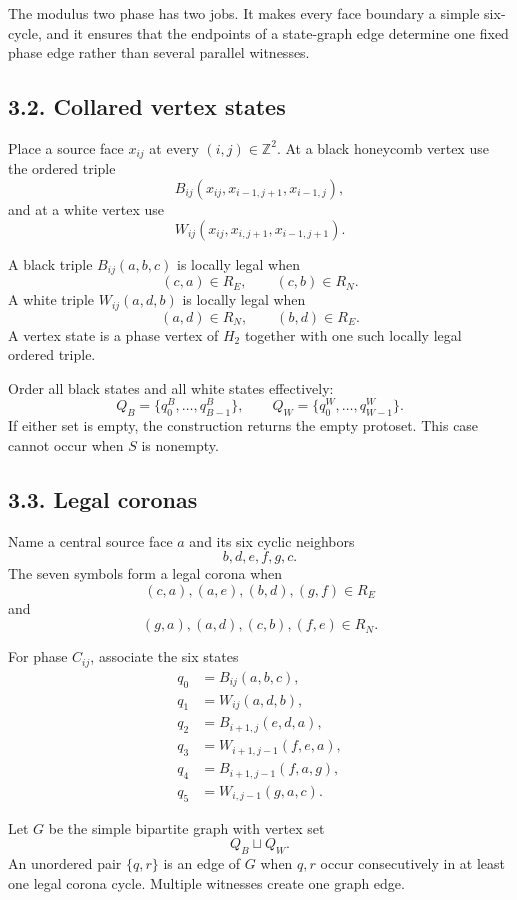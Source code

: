 \documentclass[11pt]{article}
\begin{document}
The modulus two phase has two jobs. It makes every face boundary a simple
six-cycle, and it ensures that the endpoints of a state-graph edge determine
one fixed phase edge rather than several parallel witnesses.

\subsection*{3.2. Collared vertex states}

Place a source face \(x_{ij}\) at every \((i,j)\in\mathbb Z^2\). At a black
honeycomb vertex use the ordered triple
\[
  B_{ij}(x_{ij},x_{i-1,j+1},x_{i-1,j}),
\]
and at a white vertex use
\[
  W_{ij}(x_{ij},x_{i,j+1},x_{i-1,j+1}).
\]

A black triple \(B_{ij}(a,b,c)\) is locally legal when
\[
  (c,a)\in R_E,\qquad (c,b)\in R_N.
\]
A white triple \(W_{ij}(a,d,b)\) is locally legal when
\[
  (a,d)\in R_N,\qquad (b,d)\in R_E.
\]
A vertex state is a phase vertex of \(H_2\) together with one such locally
legal ordered triple.

Order all black states and all white states effectively:
\[
  Q_B=\{q^B_0,\ldots,q^B_{B-1}\},\qquad
  Q_W=\{q^W_0,\ldots,q^W_{W-1}\}.
\]
If either set is empty, the construction returns the empty protoset. This
case cannot occur when \(S\) is nonempty.

\subsection*{3.3. Legal coronas}

Name a central source face \(a\) and its six cyclic neighbors
\[
  b,d,e,f,g,c.
\]
The seven symbols form a legal corona when
\[
  (c,a),(a,e),(b,d),(g,f)\in R_E
\]
and
\[
  (g,a),(a,d),(c,b),(f,e)\in R_N.
\]

For phase \(C_{ij}\), associate the six states
\[
\begin{split}
q_0&=B_{ij}(a,b,c),\\
q_1&=W_{ij}(a,d,b),\\
q_2&=B_{i+1,j}(e,d,a),\\
q_3&=W_{i+1,j-1}(f,e,a),\\
q_4&=B_{i+1,j-1}(f,a,g),\\
q_5&=W_{i,j-1}(g,a,c).
\end{split}
\]

Let \(G\) be the simple bipartite graph with vertex set
\[
  Q_B\sqcup Q_W.
\]
An unordered pair \(\{q,r\}\) is an edge of \(G\) when \(q,r\) occur
consecutively in at least one legal corona cycle. Multiple witnesses create
one graph edge.
\end{document}
